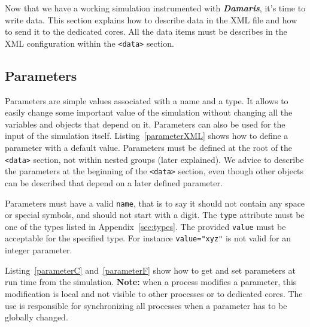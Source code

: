 \documentclass[11pt]{report}
\newcommand{\Damaris}{\emph{\textbf{Damaris}}}
\begin{document}
Now that we have a working simulation instrumented with \Damaris{}, it's time to write data.
This section explains how to describe data in the XML file and how to send it to the dedicated cores.
All the data items must be describes in the XML configuration within the \texttt{<data>} section.

\subsection{Parameters}

Parameters are simple values associated with a name and a type. It allows to
easily change some important value of the simulation without changing all the variables
and objects that depend on it. Parameters can also be used for the input of the simulation itself. 
Listing~\ref{parameterXML} shows how to define a parameter with a default value.
Parameters must be defined at the root of the \texttt{<data>}  section, not within nested groups
(later explained). We advice to describe the parameters at the beginning of the \texttt{<data>}  section,
even though other objects can be described that depend on a later defined parameter.

\noindent\begin{minipage}{\textwidth}
\vspace{0.5cm}

\end{minipage}

Parameters must have a valid \texttt{name}, that is to say it should not contain any space or special symbols,
and should not start with a digit. The \texttt{type} attribute must be one of the types listed in 
Appendix~\ref{sec:types}. The provided \texttt{value} must be acceptable for the specified type. For instance
\texttt{value="xyz"} is not valid for an integer parameter.

Listing~\ref{parameterC} and~\ref{parameterF} show how to get and set parameters at run time
from the simulation. \textbf{Note:} when a process modifies a parameter, this modification is local and
not visible to other processes or to dedicated cores. The use is responsible for synchronizing all
processes when a parameter has to be globally changed.

\noindent\begin{minipage}{\textwidth}
\vspace{0.5cm}

\end{minipage}
\end{document}
